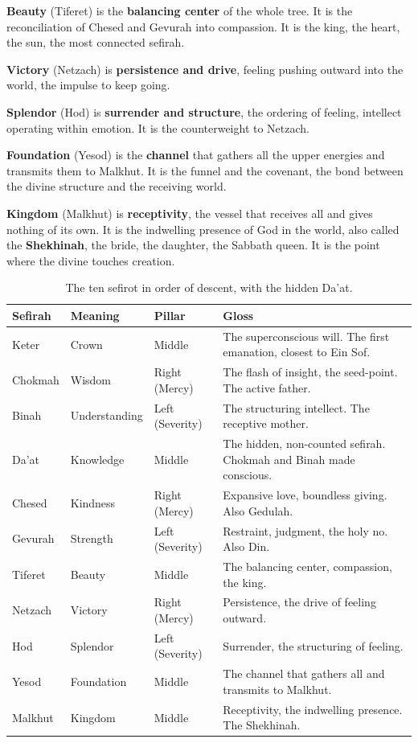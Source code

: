 \textbf{Beauty} (Tiferet) is the \textbf{balancing center} of the whole tree. It is the reconciliation
of Chesed and Gevurah into compassion. It is the king, the heart, the sun, the most connected sefirah.

\textbf{Victory} (Netzach) is \textbf{persistence and drive}, feeling pushing outward into the world,
the impulse to keep going.

\textbf{Splendor} (Hod) is \textbf{surrender and structure}, the ordering of feeling, intellect
operating within emotion. It is the counterweight to Netzach.

\textbf{Foundation} (Yesod) is the \textbf{channel} that gathers all the upper energies and transmits
them to Malkhut. It is the funnel and the covenant, the bond between the divine structure and the
receiving world.

\textbf{Kingdom} (Malkhut) is \textbf{receptivity}, the vessel that receives all and gives nothing of
its own. It is the indwelling presence of God in the world, also called the \textbf{Shekhinah}, the
bride, the daughter, the Sabbath queen. It is the point where the divine touches creation.

\begin{longtable}{l L{2.6cm} l L{5.0cm}}
\caption{The ten sefirot in order of descent, with the hidden Da'at.}\\
\toprule
\textbf{Sefirah} & \textbf{Meaning} & \textbf{Pillar} & \textbf{Gloss} \\
\midrule
Keter & Crown & Middle & The superconscious will. The first emanation, closest to Ein Sof. \\
Chokmah & Wisdom & Right (Mercy) & The flash of insight, the seed-point. The active father. \\
Binah & Understanding & Left (Severity) & The structuring intellect. The receptive mother. \\
Da'at & Knowledge & Middle & The hidden, non-counted sefirah. Chokmah and Binah made conscious. \\
Chesed & Kindness & Right (Mercy) & Expansive love, boundless giving. Also Gedulah. \\
Gevurah & Strength & Left (Severity) & Restraint, judgment, the holy no. Also Din. \\
Tiferet & Beauty & Middle & The balancing center, compassion, the king. \\
Netzach & Victory & Right (Mercy) & Persistence, the drive of feeling outward. \\
Hod & Splendor & Left (Severity) & Surrender, the structuring of feeling. \\
Yesod & Foundation & Middle & The channel that gathers all and transmits to Malkhut. \\
Malkhut & Kingdom & Middle & Receptivity, the indwelling presence. The Shekhinah. \\
\bottomrule
\end{longtable}

